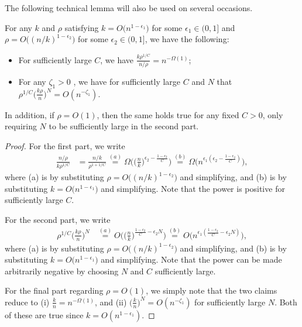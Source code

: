 The following technical lemma will also be used on several occasions.

\begin{lemma} \label{lem:asymp}
    For any $k$ and $\rho$ satisfying $k=O\big(n^{1-\epsilon_1}\big)$ for some $\epsilon_1\in(0,1]$ and $\rho=O\big((n/k)^{1-\epsilon_2}\big)$ for some $\epsilon_2 \in (0,1]$, we have the following:
    \begin{itemize}
        \item For sufficiently large $C$, we have $\frac{k\rho^{1/C}}{n/\rho} = n^{-\Omega(1)}$;
        \item For any $\zeta_1 > 0$ , we have for sufficiently large $C$ and $N$ that $\rho^{1/C}\big(\frac{k\rho}{n}\big)^N = O(n^{-\zeta_1})$.
    \end{itemize}
    In addition, if $\rho = O(1)$, then the same holds true for any fixed $C>0$, only requiring $N$ to be sufficiently large in the second part.
\end{lemma}
\begin{proof}
    For the first part, we write
    \begin{align}
        \frac{n/\rho}{k\rho^{1/C}}&=\frac{n/k}{\rho^{1+1/C}}
        \stackrel{(a)}{=}\Omega\bigg(\Big(\frac{n}{k}\Big)^{\epsilon_2-\frac{1-\epsilon_2}{C}}\bigg)
        \stackrel{(b)}{=}\Omega\big(n^{\epsilon_1(\epsilon_2-\frac{1-\epsilon_2}{C})}\big), \label{eq:k*rho^(1/C)<<n/rho_proof}
    \end{align}
    where (a) is by substituting $\rho=O\big((n/k)^{1-\epsilon_2}\big)$ and simplifying, and (b) is by substituting $k=O\big(n^{1-\epsilon_1}\big)$ and simplifying. Note that the power is positive for sufficiently large $C$.

    For the second part, we write
    \begin{align}
        \rho^{1/C}\Big(\frac{k\rho}{n}\Big)^{N}
        &\stackrel{(a)}{=} O\bigg(\Big(\frac{n}{k}\Big)^{\frac{1-\epsilon_2}{C}-\epsilon_2N}\bigg)
        \stackrel{(b)}{=}O\big(n^{\epsilon_1(\frac{1-\epsilon_2}{C}-\epsilon_2N)}\big),
    \end{align}
    where (a) is by substituting $\rho=O\big((n/k)^{1-\epsilon_2}\big)$ and simplifying, and (b) is by substituting $k=O\big(n^{1-\epsilon_1}\big)$ and simplifying.  Note that the power can be made arbitrarily negative by choosing $N$ and $C$ sufficiently large.
    
    For the final part regarding $\rho = O(1)$, we simply note that the two claims reduce to (i) $\frac{k}{n} = n^{-\Omega(1)}$, and (ii) $\big(\frac{k}{n}\big)^{N} = O(n^{-\zeta_1})$ for sufficiently large $N$.  Both of these are true since $k = O(n^{1-\epsilon_1})$.
\end{proof}

